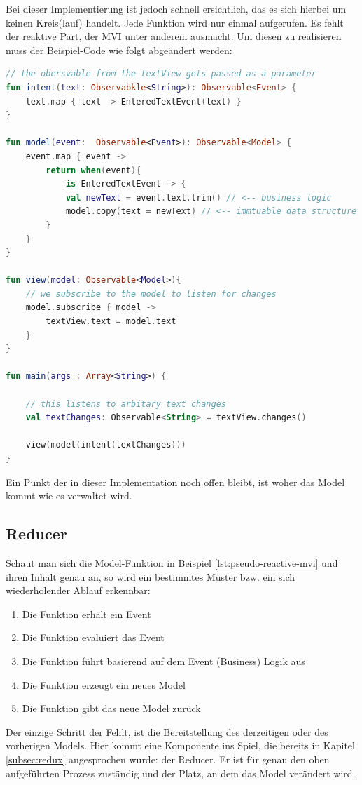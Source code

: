 Bei dieser Implementierung ist jedoch schnell ersichtlich, das es sich hierbei um keinen Kreis(lauf) handelt. Jede Funktion wird nur einmal aufgerufen. Es fehlt der reaktive Part, der MVI unter anderem ausmacht. Um diesen zu realisieren muss der Beispiel-Code wie folgt abgeändert werden:
\begin{lstlisting}[caption={pseudo mvi implementation},label={lst:pseudo-reactive-mvi},language=Kotlin]
// the obersvable from the textView gets passed as a parameter
fun intent(text: Observabkle<String>): Observable<Event> {
	text.map { text -> EnteredTextEvent(text) }
}

fun model(event:  Observable<Event>): Observable<Model> {
	event.map { event ->
		return when(event){
			is EnteredTextEvent -> {
			val newText = event.text.trim() // <-- business logic
			model.copy(text = newText) // <-- immtuable data structure
		}
	}	
}

fun view(model: Observable<Model>){
	// we subscribe to the model to listen for changes
	model.subscribe { model ->
		textView.text = model.text 	
	}	
}

fun main(args : Array<String>) {

	// this listens to arbitary text changes 
	val textChanges: Observable<String> = textView.changes()

	view(model(intent(textChanges))) 
}
\end{lstlisting}
Ein Punkt der in dieser Implementation noch offen bleibt, ist woher das Model kommt wie es verwaltet wird.

\subsection{Reducer}
Schaut man sich die Model-Funktion in Beispiel \ref{lst:pseudo-reactive-mvi} und ihren Inhalt genau an, so wird ein bestimmtes Muster bzw. ein sich wiederholender Ablauf erkennbar:
\\
\begin{enumerate}
	\item Die Funktion erhält ein Event 
	\item Die Funktion evaluiert das Event
	\item Die Funktion führt basierend auf dem Event (Business) Logik aus
	\item Die Funktion erzeugt ein neues Model
	\item Die Funktion gibt das neue Model zurück
\end{enumerate}
Der einzige Schritt der Fehlt, ist die Bereitstellung des derzeitigen oder des vorherigen Models. Hier kommt eine Komponente ins Spiel, die bereits in Kapitel
\ref{subsec:redux} 
angesprochen wurde: der Reducer. Er ist für genau den oben aufgeführten Prozess zuständig und der Platz, an dem das Model verändert wird.

